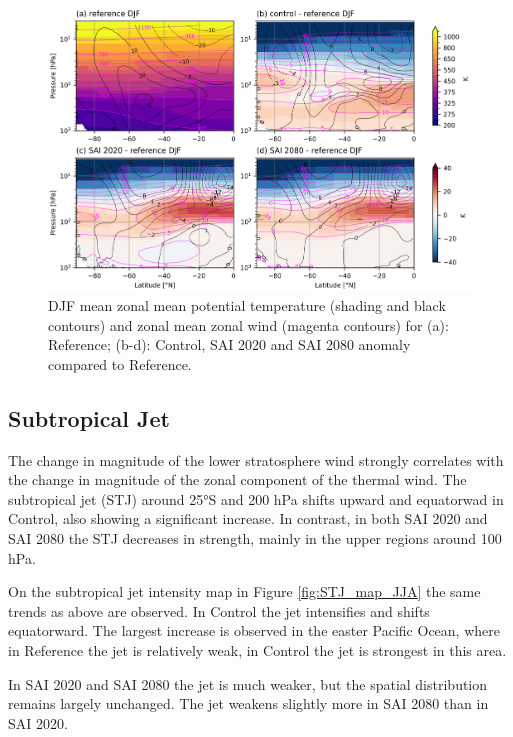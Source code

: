\begin{figure}[H]
	\centering
	\includegraphics[width=0.95\linewidth]{images/th_U_zmdiff_DJF.png}
	\caption{DJF mean zonal mean potential temperature (shading and black contours) and zonal mean zonal wind (magenta contours) for (a): Reference; (b-d): Control, SAI 2020 and SAI 2080 anomaly compared to Reference.}
	\label{fig:th_U_zmdiff_DJF}
\end{figure}


\subsection{Subtropical Jet}
The change in magnitude of the lower stratosphere wind strongly correlates with the change in magnitude of the zonal component of the thermal wind. The subtropical jet (STJ) around 25°S and 200 hPa shifts upward and equatorwad in Control, also showing a significant increase. In contrast, in both SAI 2020 and SAI 2080 the STJ decreases in strength, mainly in the upper regions around 100 hPa.  

On the subtropical jet intensity map in Figure \ref{fig:STJ_map_JJA} the same trends as above are observed. In Control the jet intensifies and shifts equatorward. The largest increase is observed in the easter Pacific Ocean, where in Reference the jet is relatively weak, in Control the jet is strongest in this area.

In SAI 2020 and SAI 2080 the jet is much weaker, but the spatial distribution remains largely unchanged. The jet weakens slightly more in SAI 2080 than in SAI 2020. 



